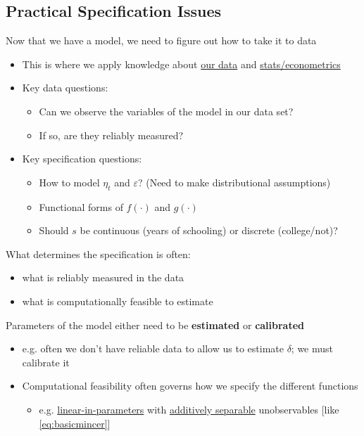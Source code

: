 \documentclass[11pt]{article}
\begin{document}
\subsection{Practical Specification Issues}
\label{sec:org7195d3c}

Now that we have a model, we need to figure out how to take it to data

\begin{itemize}
\item This is where we apply knowledge about \uline{our data} and \uline{stats/econometrics}
\item Key data questions:
\begin{itemize}
\item Can we observe the variables of the model in our data set?
\item If so, are they reliably measured?
\end{itemize}

\item Key specification questions:
\begin{itemize}
\item How to model \(\eta_t\) and \(\varepsilon\)? (Need to make distributional assumptions)
\item Functional forms of \(f(\cdot)\) and \(g(\cdot)\)
\item Should \(s\) be continuous (years of schooling) or discrete (college/not)?
\end{itemize}
\end{itemize}

What determines the specification is often:

\begin{itemize}
\item what is reliably measured in the data
\item what is computationally feasible to estimate
\end{itemize}

Parameters of the model either need to be \textbf{estimated} or \textbf{calibrated}

\begin{itemize}
\item e.g. often we don't have reliable data to allow us to estimate \(\delta\); we must calibrate it
\item Computational feasibility often governs how we specify the different functions

\begin{itemize}
\item e.g. \uline{linear-in-parameters} with \uline{additively separable} unobservables [like \eqref{eq:basicmincer}]
\end{itemize}
\end{itemize}
\end{document}
